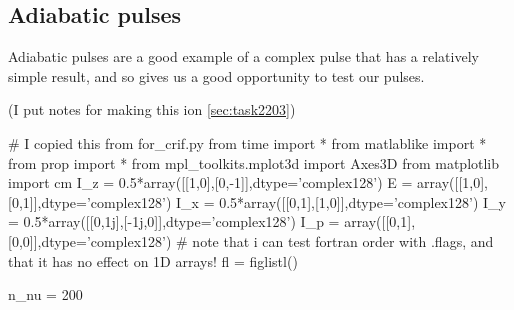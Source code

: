 \subsection{Adiabatic pulses}
Adiabatic pulses are a good example of a complex pulse that has a relatively simple result, and so gives us a good opportunity to test our pulses.

\label{sec:task2203_innb}
(I put notes for making this ion \ref{sec:task2203})

\begin{python}
# I copied this from for_crif.py
from time import *
from matlablike import *
from prop import *
from mpl_toolkits.mplot3d import Axes3D
from matplotlib import cm
I_z = 0.5*array([[1,0],[0,-1]],dtype='complex128')
E = array([[1,0],[0,1]],dtype='complex128')
I_x = 0.5*array([[0,1],[1,0]],dtype='complex128')
I_y = 0.5*array([[0,1j],[-1j,0]],dtype='complex128')
I_p = array([[0,1],[0,0]],dtype='complex128')
# note that i can test fortran order with .flags, and that it has no effect on 1D arrays!
fl = figlistl()

n_nu = 200


\end{python}
